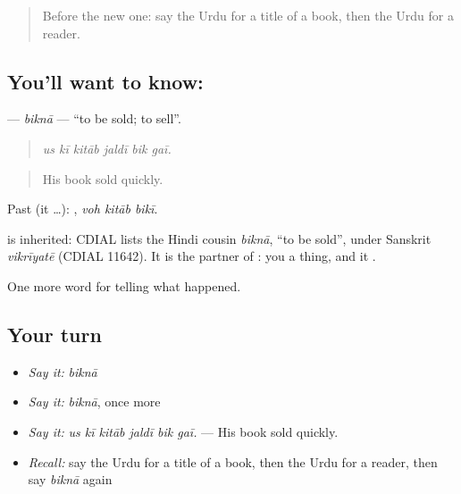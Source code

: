 \label{lesson:UR-C330-bikna}



\begin{quote}
Before the new one: say the Urdu for a title of a book, then the Urdu for a reader.
\end{quote}

\subsection*{You'll want to know: }
\textbf{} — \emph{biknā} — \textquotedblleft{}to be sold; to sell\textquotedblright{}.

\begin{quote}
     
\end{quote}

\begin{quote}
\emph{us kī kitāb jaldī bik gaī.}
\end{quote}

\begin{quote}
His book sold quickly.
\end{quote}

Past (it …):   , \emph{voh kitāb bikī}.

\begin{cousinweb}
is inherited: CDIAL lists the Hindi cousin \emph{biknā}, \textquotedblleft{}to be sold\textquotedblright{}, under Sanskrit \emph{vikrīyatē} (CDIAL 11642). It is the partner of \textbf{}: you \textbf{} a thing, and it \textbf{}.
\end{cousinweb}

\begin{grammarlens}[title={What you've built}]
One more word for telling what happened.
\end{grammarlens}

\subsection*{Your turn}
\begin{itemize}
\raggedright
  \item \emph{Say it:} \emph{biknā}
  \item \emph{Say it:} \emph{biknā}, once more
  \item \emph{Say it:} \emph{us kī kitāb jaldī bik gaī.} — His book sold quickly.
  \item \emph{Recall:} say the Urdu for a title of a book, then the Urdu for a reader, then say \emph{biknā} again
\end{itemize}

